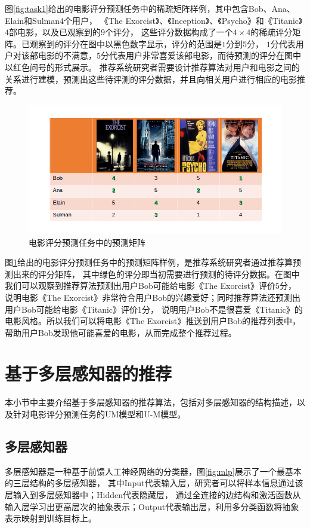 图\ref{fig:task1}给出的电影评分预测任务中的稀疏矩阵样例，其中包含Bob、Ana、Elain和Sulman$4$个用户，
《The Exorcist》、《Inception》、《Psycho》和《Titanic》$4$部电影，以及已观察到的$9$个评分，
这些评分数据构成了一个$4 \times 4$的稀疏评分矩阵。已观察到的评分在图中以黑色数字显示，评分的范围是$1$分到$5$分，
$1$分代表用户对该部电影的不满意，$5$分代表用户非常喜爱该部电影，而待预测的评分在图中以红色问号的形式展示。
推荐系统研究者需要设计推荐算法对用户和电影之间的关系进行建模，预测出这些待评测的评分数据，并且向相关用户进行相应的电影推荐。

\begin{figure}[htbp]
\centering
\includegraphics[scale=0.6]{images/task2.png}
\caption{电影评分预测任务中的预测矩阵}
\label{fig:task2}
\end{figure}

图\ref{fig:task2}给出的电影评分预测任务中的预测矩阵样例，是推荐系统研究者通过推荐算预测出来的评分矩阵，
其中绿色的评分即当初需要进行预测的待评分数据。在图中我们可以观察到推荐算法预测出用户Bob可能给电影《The Exorcist》评价$5$分，
说明电影《The Exorcist》非常符合用户Bob的兴趣爱好；同时推荐算法还预测出用户Bob可能给电影《Titanic》评价$1$分，
说明用户Bob不是很喜爱《Titanic》的电影风格。所以我们可以将电影《The Exorcist》推送到用户Bob的推荐列表中，
帮助用户Bob发现他可能喜爱的电影，从而完成整个推荐过程。

\section{基于多层感知器的推荐}
本小节中主要介绍基于多层感知器的推荐算法，包括对多层感知器的结构描述，以及针对电影评分预测任务的UM模型和U-M模型。

\subsection{多层感知器}
多层感知器是一种基于前馈人工神经网络的分类器，图\ref{fig:mlp}展示了一个最基本的三层结构的多层感知器，
其中Input代表输入层，研究者可以将样本信息通过该层输入到多层感知器中；Hidden代表隐藏层，
通过全连接的边结构和激活函数从输入层学习出更高层次的抽象表示；Output代表输出层，利用多分类函数将抽象表示映射到训练目标上。

